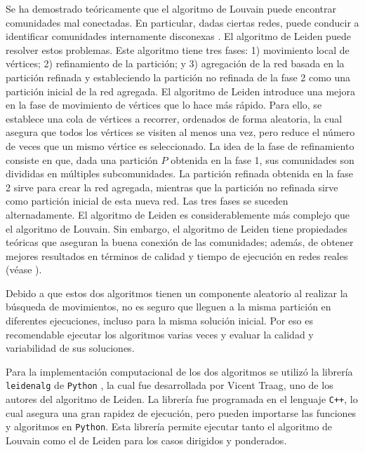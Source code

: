 Se ha demostrado teóricamente que el algoritmo de Louvain puede encontrar comunidades mal conectadas. En particular, dadas ciertas redes, puede conducir a identificar comunidades internamente disconexas \parencite[p.~2]{Traag2019}. El algoritmo de Leiden puede resolver estos problemas. Este algoritmo tiene tres fases: 1) movimiento local de vértices; 2) refinamiento de la partición; y 3) agregación de la red basada en la partición refinada y estableciendo la partición no refinada de la fase 2 como una partición inicial de la red agregada. El algoritmo de Leiden introduce una mejora en la fase de movimiento de vértices que lo hace más rápido. Para ello, se establece una cola de vértices a recorrer, ordenados de forma aleatoria, la cual asegura que todos los vértices se visiten al menos una vez, pero reduce el número de veces que un mismo vértice es seleccionado. La idea de la fase de refinamiento consiste en que, dada una partición $P$ obtenida en la fase 1, sus comunidades son divididas en múltiples subcomunidades. La partición refinada obtenida en la fase 2 sirve para crear la red agregada, mientras que la partición no refinada sirve como partición inicial de esta nueva red. Las tres fases se suceden alternadamente. El algoritmo de Leiden es considerablemente más complejo que el algoritmo de Louvain. Sin embargo, el algoritmo de Leiden tiene propiedades teóricas que aseguran la buena conexión de las comunidades; además, de obtener mejores resultados en términos de calidad y tiempo de ejecución en redes reales (véase \textcite{Traag2019, Aref2024}).

Debido a que estos dos algoritmos tienen un componente aleatorio al realizar la búsqueda de movimientos, no es seguro que lleguen a la misma partición en diferentes ejecuciones, incluso para la misma solución inicial. Por eso es recomendable ejecutar los algoritmos varias veces y evaluar la calidad y variabilidad de sus soluciones. %


Para la implementación computacional de los dos algoritmos se utilizó la librería \texttt{leidenalg} de \texttt{Python} \parencite{Traag2023}, la cual fue desarrollada por Vicent Traag, uno de los autores del algoritmo de Leiden. La librería fue programada en el lenguaje \texttt{C++}, lo cual asegura una gran rapidez de ejecución, pero pueden importarse las funciones y algoritmos en \texttt{Python}. Esta librería permite ejecutar tanto el algoritmo de Louvain como el de Leiden para los casos dirigidos y ponderados.

